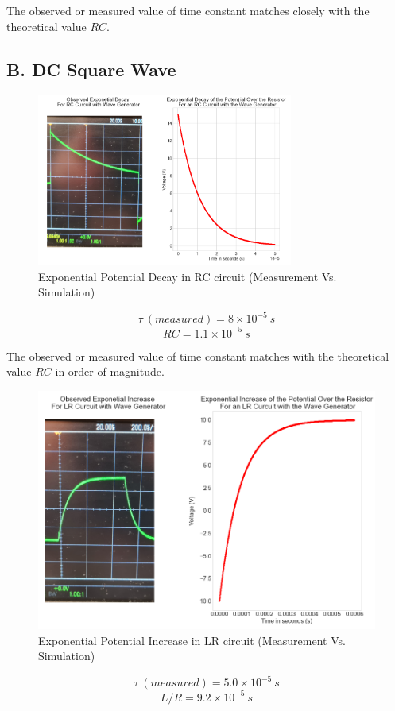 \documentclass[a4paper,12pt]{article}
\begin{document}
The observed or measured value of time constant matches closely with the theoretical value $RC$. 

\subsection*{B. DC Square Wave}

\begin{figure}[H]
  \centerline{\includegraphics[width=0.75\textwidth]{../Simulated Curves/RC_W-mod.png}}
  \caption{Exponential Potential Decay in RC circuit (Measurement Vs. Simulation)}
  \label{Combined_RC_W}
\end{figure}
$$\tau\ (measured) = 8 \times 10^{-5}\ s$$
$$RC = 1.1 \times 10^{-5}\ s$$

The observed or measured value of time constant matches with the theoretical value $RC$ in order of magnitude. 

\begin{figure}[H]
  \centerline{\includegraphics[width=0.75\linewidth]{../Simulated Curves/LR_W-mod.png}}
  \caption{Exponential Potential Increase in LR circuit (Measurement Vs. Simulation)}
  \label{Combined_LR_W}
\end{figure}
$$\tau\ (measured) = 5.0 \times 10^{-5}\ s$$
$$L/R = 9.2 \times 10^{-5}\ s$$
\end{document}
